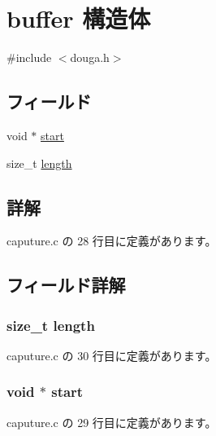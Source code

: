 \hypertarget{structbuffer}{}\section{buffer 構造体}
\label{structbuffer}


{\ttfamily \#include $<$douga.\+h$>$}

\subsection*{フィールド}
\begin{DoxyCompactItemize}
\item 
void $\ast$ \hyperlink{structbuffer_a8f4a30968a1f0f4576a5157399d08267}{start}
\item 
size\+\_\+t \hyperlink{structbuffer_ae809d5359ac030c60a30a8f0b2294b82}{length}
\end{DoxyCompactItemize}


\subsection{詳解}


 caputure.\+c の 28 行目に定義があります。



\subsection{フィールド詳解}
\hypertarget{structbuffer_ae809d5359ac030c60a30a8f0b2294b82}{}
\subsubsection[{length}]{\setlength{\rightskip}{0pt plus 5cm}size\+\_\+t length}\label{structbuffer_ae809d5359ac030c60a30a8f0b2294b82}


 caputure.\+c の 30 行目に定義があります。

\hypertarget{structbuffer_a8f4a30968a1f0f4576a5157399d08267}{}
\subsubsection[{start}]{\setlength{\rightskip}{0pt plus 5cm}void $\ast$ start}\label{structbuffer_a8f4a30968a1f0f4576a5157399d08267}


 caputure.\+c の 29 行目に定義があります。



